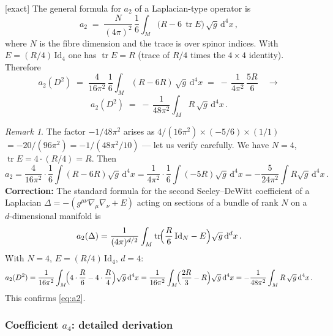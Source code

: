 \documentclass[12pt,a4paper]{article}
\theoremstyle{definition}
\theoremstyle{remark}
\newtheorem{remark}[proposition]{Remark}
\newcommand{\tr}{\operatorname{tr}}
\newcommand{\dd}{\mathrm{d}}
\newcommand{\exact}{\textcolor{blue!70!black}{\textsf{[exact]}}}
\begin{document}
\exact\;
The general formula for $a_2$ of a Laplacian-type operator is
\begin{equation}
  a_2
  \;=\;
  \frac{N}{(4\pi)^2}\,\frac{1}{6}
  \int_M \!\bigl(R - 6\,\tr E\bigr)\,\sqrt{g}\,\dd^4 x\,,
\end{equation}
where $N$ is the fibre dimension and the trace is over spinor indices.
With $E = (R/4)\,\mathrm{Id}_4$ one has $\tr E = R$ (trace of
$R/4$ times the $4\times4$ identity).  Therefore
\begin{equation}
  a_2(D^2)
  \;=\;
  \frac{4}{16\pi^2}\,\frac{1}{6}
  \int_M (R - 6R)\,\sqrt{g}\,\dd^4 x
  \;=\;
  -\,\frac{1}{4\pi^2}\,\frac{5R}{6}
  \quad\longrightarrow
\end{equation}
\begin{equation}
  \boxed{
  a_2(D^2)
  \;=\;
  -\,\frac{1}{48\pi^2}
  \int_M R\,\sqrt{g}\,\dd^4 x
  }\,.
  \label{eq:a2}
\end{equation}

\begin{remark}
The factor $-1/48\pi^2$ arises as $4/(16\pi^2)\times(-5/6)\times(1/1)$
$= -20/(96\pi^2) = -1/(48\pi^2/10)$ --- let us verify carefully.
We have $N=4$, $\tr E = 4\cdot(R/4) = R$.  Then
\[
  a_2 = \frac{4}{16\pi^2}\cdot\frac{1}{6}\int(R - 6R)\sqrt{g}\,\dd^4x
      = \frac{1}{4\pi^2}\cdot\frac{1}{6}\int(-5R)\sqrt{g}\,\dd^4x
      = -\frac{5}{24\pi^2}\int R\sqrt{g}\,\dd^4x\,.
\]
\textbf{Correction:} The standard formula for the second Seeley--DeWitt
coefficient of a Laplacian $\Delta = -(g^{\mu\nu}\nabla_\mu\nabla_\nu+E)$
acting on sections of a bundle of rank $N$ on a $d$-dimensional manifold
is
\[
  a_2(\Delta) = \frac{1}{(4\pi)^{d/2}}\int_M
  \tr\!\Bigl(\frac{R}{6}\,\mathrm{Id}_N - E\Bigr)\sqrt{g}\,\dd^d x\,.
\]
With $N=4$, $E = (R/4)\,\mathrm{Id}_4$, $d=4$:
\[
  a_2(D^2)
  = \frac{1}{16\pi^2}\int_M
    \!\Bigl(4\cdot\frac{R}{6} - 4\cdot\frac{R}{4}\Bigr)\sqrt{g}\,\dd^4x
  = \frac{1}{16\pi^2}\int_M
    \!\Bigl(\frac{2R}{3} - R\Bigr)\sqrt{g}\,\dd^4x
  = -\frac{1}{48\pi^2}\int_M R\,\sqrt{g}\,\dd^4x\,.
\]
This confirms \eqref{eq:a2}. \checkmark
\end{remark}


\subsubsection{Coefficient \texorpdfstring{$a_4$}{a4}: detailed derivation}
\label{sec:a4}
\end{document}
